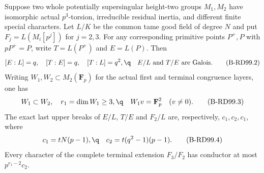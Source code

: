 \begin{lemma}
\label{lem:B-RD99-points}
Suppose two whole potentially supersingular height-two groups
$M_1,M_2$ have isomorphic actual $p^3$-torsion, irreducible
residual inertia, and different finite special characters.
Let $L/K$ be the common tame good field of degree $N$ and put
$F_j=L(M_i[p^j])$ for $j=2,3$. For any corresponding primitive
points $P^+,P$ with $pP^+=P$, write $T=L(P^+)$ and $E=L(P)$.
Then
\[
 [E:L]=q,\quad[T:E]=q,\quad[T:L]=q^2,\q\quad
 E/L\text{ and }T/E\text{ are Galois}.                 \tag{B-RD99.2}
\]
Writing $W_1,W_2\subset M_2(\mathbf F_p)$ for the actual
first and terminal congruence layers, one has
\[
 W_1\subset W_2,\quad r_1=\dim W_1\ge3,
 \q\quad W_1v=\mathbf F_p^2\quad(v\ne0).               \tag{B-RD99.3}
\]
The exact last upper breaks of $E/L$, $T/E$ and $F_2/L$ are,
respectively, $c_1,c_2,c_1$, where
\[
 c_1=tN(p-1),\q\quad c_2=t(q^2-1)(p-1).
                                                        \tag{B-RD99.4}
\]
Every character of the complete terminal extension $F_3/F_2$
has conductor at most $p^{r_1-2}c_2$.
\end{lemma}
